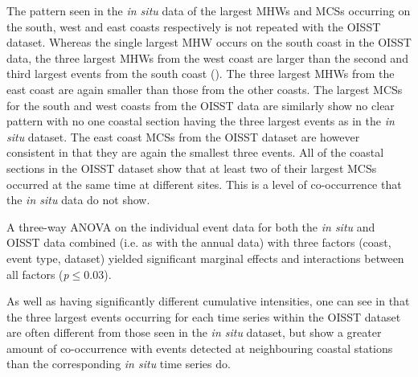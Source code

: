 \documentclass[a4paper,10pt,review]{elsarticle}
\begin{document}
The pattern seen in the \emph{in situ} data of the largest MHWs and MCSs occurring on the south, west and east coasts respectively is not repeated with the OISST dataset. Whereas the single largest MHW occurs on the south coast in the OISST data, the three largest MHWs from the west coast are larger than the second and third largest events from the south coast (). The three largest MHWs from the east coast are again smaller than those from the other coasts. The largest MCSs for the south and west coasts from the OISST data are similarly show no clear pattern with no one coastal section having the three largest events as in the \emph{in situ} dataset. The east coast MCSs from the OISST dataset are however consistent in that they are again the smallest three events. All of the coastal sections in the OISST dataset show that at least two of their largest MCSs occurred at the same time at different sites. This is a level of co-occurrence that the \emph{in situ} data do not show.

A three-way ANOVA on the individual event data for both the \emph{in situ} and OISST data combined (i.e. as with the annual data) with three factors (coast, event type, dataset) yielded significant marginal effects and interactions between all factors (\emph{p}$\leq$0.03).

As well as having significantly different cumulative intensities, one can see in  that the three largest events occurring for each time series within the OISST dataset are often different from those seen in the \emph{in situ} dataset, but show a greater amount of co-occurrence with events detected at neighbouring coastal stations than the corresponding \emph{in situ} time series do.
\end{document}
